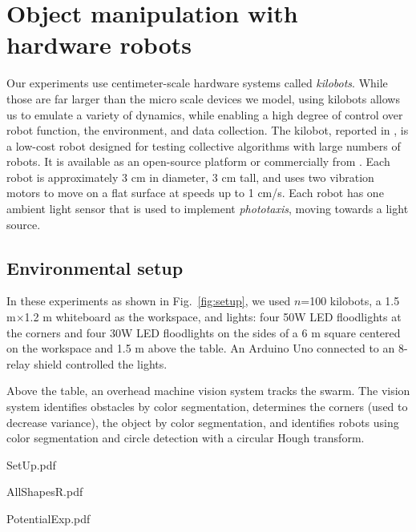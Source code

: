 
\section{Object manipulation with hardware robots}\label{sec:realExperiment}
Our experiments use centimeter-scale hardware systems called \emph{kilobots}.  While those are far larger than the micro scale devices we model, using kilobots allows us to emulate a variety of dynamics, while enabling a high degree of control over robot function, the environment, and data collection. The kilobot, reported in \cite{Rubenstein2012,rubenstein2014programmable}, is a low-cost robot designed for testing collective algorithms with large numbers of robots. It is available as an open-source platform or commercially from \cite{K-Team2015}.  Each robot is approximately 3 cm in diameter, 3 cm tall, and uses two vibration motors to move on a flat surface at speeds up to 1 cm/s.  Each robot has one ambient light sensor that is used to implement \emph{phototaxis},  moving towards a light source. 

  
\subsection{Environmental setup}  
In these experiments as shown in Fig.~\ref{fig:setup}, we used $n$=100 kilobots, a 1.5 m$\times$1.2 m whiteboard as the workspace, and lights: four 50W LED floodlights  at the corners and four 30W LED floodlights on the sides of a 6 m square centered on the workspace and 1.5 m above the table. An Arduino Uno connected to an 8-relay shield controlled the lights.  

Above the table, an overhead machine vision system tracks the swarm. The vision system identifies obstacles by color segmentation, determines the corners  (used to decrease  variance), the object by color segmentation, and identifies robots using color segmentation and circle detection with a circular Hough transform. 

\begin{figure*}
\renewcommand{\figwid}{6cm}
\begin{center}
	\begin{overpic}[height=\figwid]{SetUp.pdf}%
	\end{overpic}\begin{overpic}[height=\figwid]{AllShapesR.pdf}%
	\end{overpic}\begin{overpic}[height=\figwid]{PotentialExp.pdf}%
	\end{overpic}
\end{center}
\caption{\label{fig:setup}
Hardware platform. At right are the shapes used for hardware experiments and a visualization of the potential field. }
\end{figure*}


